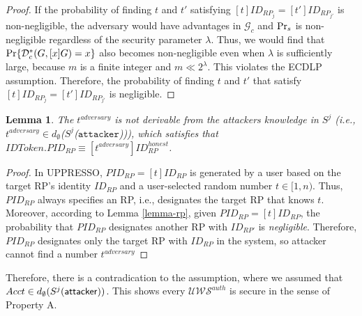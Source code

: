 \documentclass[letterpaper,onecolumn,10pt]{article}
\newtheorem{lemma}{Lemma}
\begin{document}
\begin{proof}
  If the probability of finding $t$ and $t'$ satisfying $[t]ID_{RP_j} = [t']ID_{RP_{j'}}$ is non-negligible, the adversary would have advantages  in $\mathcal{G}_c$ and ${\rm Pr}_s$ is non-negligible regardless of the security parameter $\lambda$.
  Thus, we would find that ${\rm Pr}\{\mathcal{D}^*_c(G, [x]G)=x\}$ also becomes non-negligible even when $\lambda$ is sufficiently large, because $m$ is a finite integer and $m \ll 2^\lambda$.
  \color{black}
  This violates the ECDLP assumption. Therefore, the probability of finding $t$ and $t'$ that satisfy $[t]ID_{RP_j} = [t']ID_{RP_{j'}}$ is negligible. \hfill
\end{proof}

\begin{lemma}
  The $t^{adversary}$ is not derivable from the attackers knowledge in $S^j$ (i.e., $t^{adversary} \in d_{\emptyset}$($S^j$($\mathtt{attacker}$))), which satisfies that $IDToken.PID_{RP} \equiv [t^{adversary}]ID_{RP}^{honest}$.
\end{lemma}
\begin{proof}
  In UPPRESSO, $PID_{RP}=[t]ID_{RP}$ is generated by a user based on the target RP's identity $ID_{RP}$ and a user-selected random number $t \in [1,n)$.
  Thus, $PID_{RP}$ always specifies an RP, i.e., %
  designates the target RP that knows $t$. 
  Moreover, according to Lemma \ref{lemma-rp}, given $PID_{RP} = [t]ID_{RP}$, the probability that $PID_{RP}$ designates another RP with $ID_{RP'}$ is \emph{negligible}. %
  Therefore, $PID_{RP}$ designates only the target RP with $ID_{RP}$ in the system, 
  so attacker cannot find a number $t^{adversary}$\hfill
\end{proof}

Therefore, there is a contradication to the assumption, where we assumed that 
$Acct \in d_{\emptyset}(S^j(\mathsf{attacker}))$. 
This shows every $\mathcal{U\!W\!S}^{auth}$ is secure in the sense of Property A.
\end{document}
